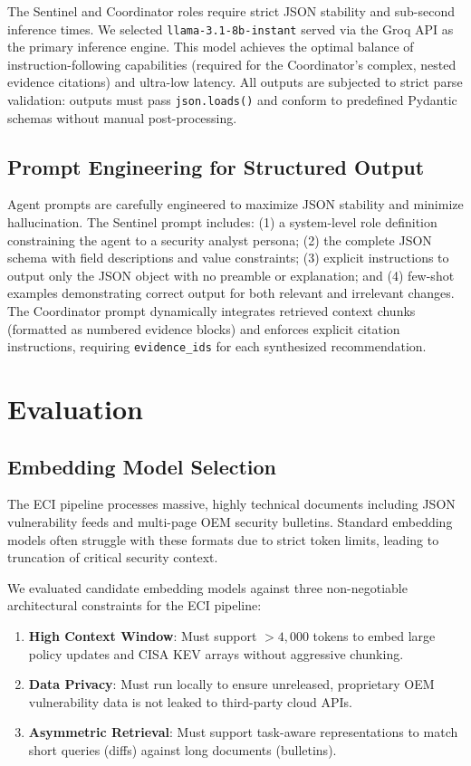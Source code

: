 \documentclass[
]{article}
\begin{document}
The Sentinel and Coordinator roles require strict JSON stability and sub-second inference times. We selected \texttt{llama-3.1-8b-instant} served via the Groq API as the primary inference engine. This model achieves the optimal balance of instruction-following capabilities (required for the Coordinator's complex, nested evidence citations) and ultra-low latency. All outputs are subjected to strict parse validation: outputs must pass \texttt{json.loads()} and conform to predefined Pydantic schemas without manual post-processing.

\subsection{Prompt Engineering for Structured Output}\label{prompt-engineering-for-structured-output}

Agent prompts are carefully engineered to maximize JSON stability and minimize hallucination. The Sentinel prompt includes: (1) a system-level role definition constraining the agent to a security analyst persona; (2) the complete JSON schema with field descriptions and value constraints; (3) explicit instructions to output only the JSON object with no preamble or explanation; and (4) few-shot examples demonstrating correct output for both relevant and irrelevant changes. The Coordinator prompt dynamically integrates retrieved context chunks (formatted as numbered evidence blocks) and enforces explicit citation instructions, requiring \texttt{evidence\_ids} for each synthesized recommendation.

\section{Evaluation}\label{preliminary-evaluation}

\subsection{Embedding Model Selection}\label{retrieval-quality}

The ECI pipeline processes massive, highly technical documents including JSON vulnerability feeds and multi-page OEM security bulletins. Standard embedding models often struggle with these formats due to strict token limits, leading to truncation of critical security context.

We evaluated candidate embedding models against three non-negotiable architectural constraints for the ECI pipeline:
\begin{enumerate}
    \item \textbf{High Context Window}: Must support $>4,000$ tokens to embed large policy updates and CISA KEV arrays without aggressive chunking.
    \item \textbf{Data Privacy}: Must run locally to ensure unreleased, proprietary OEM vulnerability data is not leaked to third-party cloud APIs.
    \item \textbf{Asymmetric Retrieval}: Must support task-aware representations to match short queries (diffs) against long documents (bulletins).
\end{enumerate}
\end{document}
